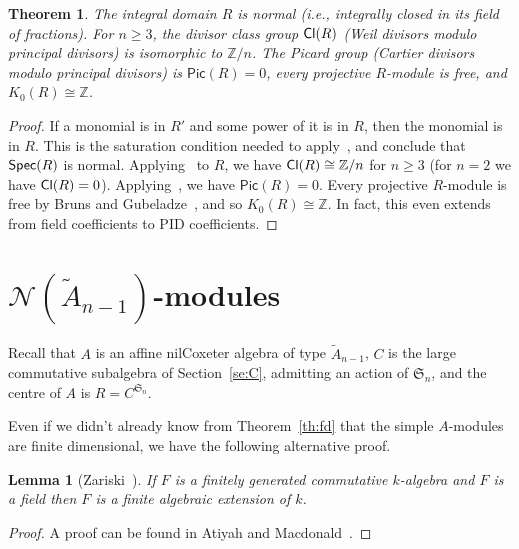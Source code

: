 \documentclass[12pt]{amsart}
\newcommand{\Cl}{\operatorname{\sf Cl}}
\renewcommand{\ge}{\geqslant}
\newcommand{\Spec}{\operatorname{\sf Spec}}
\newcommand{\sym}[1]{\mathfrak{S}_{#1}}
\newcommand{\Pic}{\mathsf{Pic}}
\newcommand{\bZ}{{\mathbb{Z}}}
\newcommand{\mcN}{\mathcal{N}}
\numberwithin{equation}{section}
\newtheorem{theorem}[equation]{Theorem}
\newtheorem{lemma}[equation]{Lemma}
\theoremstyle{definition}
\begin{document}
\begin{theorem}
The integral domain $R$ is normal (i.e., integrally closed in its
field of fractions).
For $n\ge 3$, the divisor class group $\Cl(R)$ (Weil divisors modulo principal
divisors) is isomorphic to $\bZ/n$. The Picard group (Cartier divisors
modulo principal divisors) is $\Pic(R)=0$, every projective $R$-module is free, and $K_0(R)\cong\bZ$.
\end{theorem}
\begin{proof}
If a monomial is in $R'$ and some power of it is in $R$, then the
monomial is in $R$. This is the saturation condition needed to
apply~\cite[Theorem~1.3.5]{Cox/Little/Schenck:2011a}, and conclude
that $\Spec(R)$ is normal.
Applying~\cite[Theorem~4.1.3]{Cox/Little/Schenck:2011a} to $R$, 
we have $\Cl(R)\cong\bZ/n$ for $n\ge 3$ (for $n=2$ we have
$\Cl(R)=0$). Applying~\cite[Proposition~4.2.2]{Cox/Little/Schenck:2011a},
we have $\Pic(R)=0$. Every projective
$R$-module is free by Bruns and
Gubeladze~\cite[Theorem~8.4]{Bruns/Gubeladze:2009a}, and so $K_0(R)\cong\bZ$.
In fact, this even extends from field coefficients to PID
coefficients.
\end{proof}

\section{\texorpdfstring{$\mcN(\tilde A_{n-1})$-modules}{𝓝(Ãₙ₋₁)-modules}}%
\label{se:Amodules}

Recall that $A$ is an affine nilCoxeter algebra of type $\tilde
A_{n-1}$, $C$ is the large commutative subalgebra of
Section~\ref{se:C}, admitting an action of
$\sym{n}$,  and the centre of $A$ is $R=C^{\sym{n}}$.


Even if we didn't already know from Theorem~\ref{th:fd}
that the simple $A$-modules are finite dimensional, we have the
following alternative proof. 

\begin{lemma}[Zariski~\cite{Zariski:1947a}]\label{le:Zariski}
If $F$ is a finitely generated commutative $k$-algebra and $F$ is a
field then $F$ is a finite algebraic extension of $k$.
\end{lemma}
\begin{proof}
A proof can be found in Atiyah and
Macdonald~\cite{Atiyah/Macdonald:1969a}.
\end{proof}
\end{document}
